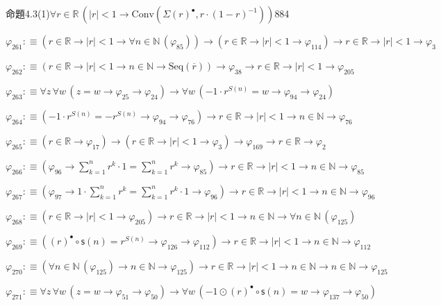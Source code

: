 \begin{fullproof}{命題4.3(1)}{$\forall r \in \mathbb{R}\,(\lvert r \rvert < 1 \to \mathrm{Conv}(\Sigma {(r)^{\bullet}},r \cdot (1 - r)^{-1}))$}{884}
\begin{abbrevlist}
\item $\varphi_{261} :\equiv (r \in \mathbb{R} \to \lvert r \rvert < 1 \to \forall n \in \mathbb{N}\,(\varphi_{85})) \to (r \in \mathbb{R} \to \lvert r \rvert < 1 \to \varphi_{114}) \to r \in \mathbb{R} \to \lvert r \rvert < 1 \to \varphi_{3}$
\item $\varphi_{262} :\equiv (r \in \mathbb{R} \to \lvert r \rvert < 1 \to n \in \mathbb{N} \to \mathrm{Seq}(\overline{r})) \to \varphi_{38} \to r \in \mathbb{R} \to \lvert r \rvert < 1 \to \varphi_{205}$
\item $\varphi_{263} :\equiv \forall z\,\forall w\,(z = w \to \varphi_{25} \to \varphi_{24}) \to \forall w\,(-1 \cdot {{r}^{S(n)}} = w \to \varphi_{94} \to \varphi_{24})$
\item $\varphi_{264} :\equiv (-1 \cdot {{r}^{S(n)}} = -{{r}^{S(n)}} \to \varphi_{94} \to \varphi_{76}) \to r \in \mathbb{R} \to \lvert r \rvert < 1 \to n \in \mathbb{N} \to \varphi_{76}$
\item $\varphi_{265} :\equiv (r \in \mathbb{R} \to \varphi_{17}) \to (r \in \mathbb{R} \to \lvert r \rvert < 1 \to \varphi_{3}) \to \varphi_{169} \to r \in \mathbb{R} \to \varphi_{2}$
\item $\varphi_{266} :\equiv (\varphi_{96} \to {\textstyle\sum_{k=1}^{n} {{r}^{k}}} \cdot 1 = {\textstyle\sum_{k=1}^{n} {{r}^{k}}} \to \varphi_{85}) \to r \in \mathbb{R} \to \lvert r \rvert < 1 \to n \in \mathbb{N} \to \varphi_{85}$
\item $\varphi_{267} :\equiv (\varphi_{97} \to 1 \cdot {\textstyle\sum_{k=1}^{n} {{r}^{k}}} = {\textstyle\sum_{k=1}^{n} {{r}^{k}}} \cdot 1 \to \varphi_{96}) \to r \in \mathbb{R} \to \lvert r \rvert < 1 \to n \in \mathbb{N} \to \varphi_{96}$
\item $\varphi_{268} :\equiv (r \in \mathbb{R} \to \lvert r \rvert < 1 \to \varphi_{205}) \to r \in \mathbb{R} \to \lvert r \rvert < 1 \to n \in \mathbb{N} \to \forall n \in \mathbb{N}\,(\varphi_{125})$
\item $\varphi_{269} :\equiv ({(r)^{\bullet}} \circ \mathsf{s}(n) = {{r}^{S(n)}} \to \varphi_{126} \to \varphi_{112}) \to r \in \mathbb{R} \to \lvert r \rvert < 1 \to n \in \mathbb{N} \to \varphi_{112}$
\item $\varphi_{270} :\equiv (\forall n \in \mathbb{N}\,(\varphi_{125}) \to n \in \mathbb{N} \to \varphi_{125}) \to r \in \mathbb{R} \to \lvert r \rvert < 1 \to n \in \mathbb{N} \to n \in \mathbb{N} \to \varphi_{125}$
\item $\varphi_{271} :\equiv \forall z\,\forall w\,(z = w \to \varphi_{51} \to \varphi_{50}) \to \forall w\,(-1 \odot {(r)^{\bullet}} \circ \mathsf{s}(n) = w \to \varphi_{137} \to \varphi_{50})$

\end{abbrevlist}
\end{fullproof}
